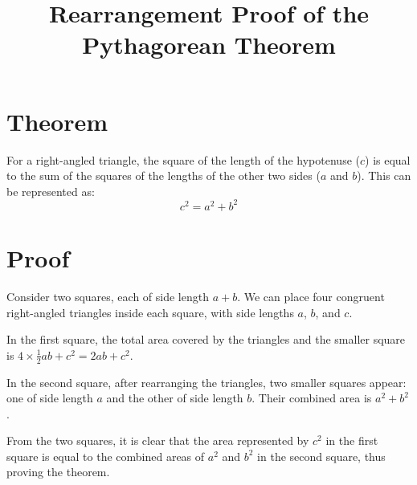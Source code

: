 \documentclass{article}
\begin{document}
\title{Rearrangement Proof of the Pythagorean Theorem}
\maketitle

\section*{Theorem}
For a right-angled triangle, the square of the length of the hypotenuse ($c$) is equal to the sum of the squares of the lengths of the other two sides ($a$ and $b$). This can be represented as:
\[ c^2 = a^2 + b^2 \]

\section*{Proof}

Consider two squares, each of side length \(a + b\). We can place four congruent right-angled triangles inside each square, with side lengths \(a\), \(b\), and \(c\).

\begin{center}
\end{center}

In the first square, the total area covered by the triangles and the smaller square is \(4 \times \frac{1}{2}ab + c^2 = 2ab + c^2\).

In the second square, after rearranging the triangles, two smaller squares appear: one of side length \(a\) and the other of side length \(b\). Their combined area is \(a^2 + b^2\).

From the two squares, it is clear that the area represented by \(c^2\) in the first square is equal to the combined areas of \(a^2\) and \(b^2\) in the second square, thus proving the theorem.
\end{document}
